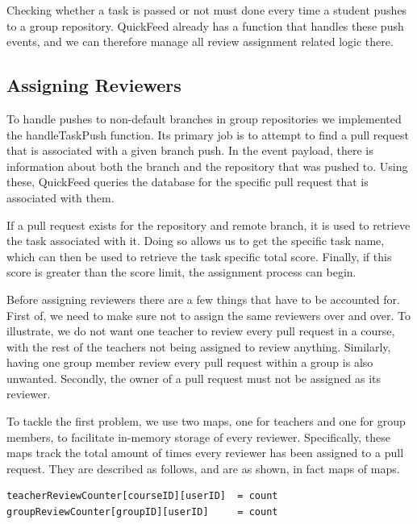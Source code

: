 Checking whether a task is passed or not must done every time a student pushes to a group repository.
QuickFeed already has a function that handles these push events, and we can therefore manage all review assignment related logic there.

\subsection{Assigning Reviewers}

To handle pushes to non-default branches in group repositories we implemented the handleTaskPush function.
Its primary job is to attempt to find a pull request that is associated with a given branch push.
In the event payload, there is information about both the branch and the repository that was pushed to.
Using these, QuickFeed queries the database for the specific pull request that is associated with them.

If a pull request exists for the repository and remote branch, it is used to retrieve the task associated with it.
Doing so allows us to get the specific task name, which can then be used to retrieve the task specific total score.
Finally, if this score is greater than the score limit, the assignment process can begin.

Before assigning reviewers there are a few things that have to be accounted for.
First of, we need to make sure not to assign the same reviewers over and over.
To illustrate, we do not want one teacher to review every pull request in a course, with the rest of the teachers not being assigned to review anything.
Similarly, having one group member review every pull request within a group is also unwanted.
Secondly, the owner of a pull request must not be assigned as its reviewer.

To tackle the first problem, we use two maps, one for teachers and one for group members, to facilitate in-memory storage of every reviewer.
Specifically, these maps track the total amount of times every reviewer has been assigned to a pull request.
They are described as follows, and are as shown, in fact maps of maps.

\begin{lstlisting}[caption={Maps used to store review counts}, language=Golang, numbers=none]
teacherReviewCounter[courseID][userID]  = count
groupReviewCounter[groupID][userID]     = count
\end{lstlisting}

